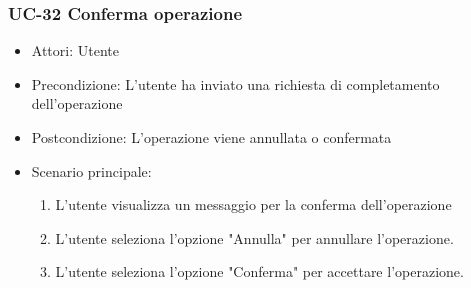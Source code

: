\subsubsection{UC-32 Conferma operazione}		
\begin{itemize}
	\item Attori: Utente
	\item Precondizione: L'utente ha inviato una richiesta di completamento dell'operazione
	\item Postcondizione: L'operazione viene annullata o confermata
	\item Scenario principale:
	\begin{enumerate}
		\item L'utente visualizza un messaggio per la conferma dell'operazione
		\item L'utente seleziona l'opzione "Annulla" per annullare l'operazione.
		\item L'utente seleziona l'opzione "Conferma" per accettare l'operazione.
	\end{enumerate}		
\end{itemize}
